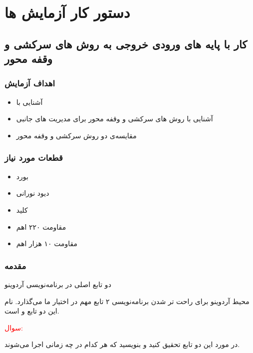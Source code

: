 \chapter{دستور کار آزمایش ها}

\section{کار با پایه های ورودی خروجی به روش های سرکشی و وقفه محور}

\subsection{اهداف آزمایش}
\begin{itemize}
    \item آشنایی با 
    \item آشنایی با روش های سرکشی و وقفه محور برای مدیریت  های جانبی
    \item مقایسه‌ی دو روش سرکشی و وقفه محور
\end{itemize}

\subsection{قطعات مورد نیاز}

\begin{itemize}
    \item بورد 
    \item دیود نورانی 
    \item کلید 
    \item مقاومت ۲۲۰ اهم
    \item مقاومت ۱۰ هزار اهم
\end{itemize}
\pagebreak

\subsection{مقدمه}

\begin{nas} دو تابع اصلی در برنامه‌نویسی آردوینو \end{nas}
\newline
محیط آردوینو برای راحت تر شدن برنامه‌نویسی ۲ تابع مهم در اختیار ما می‌گذارد. نام این دو تابع  و  است.
\newline
\textcolor{red}{\begin{nas}سوال: \end{nas}}
در مورد این دو تابع تحقیق کنید و بنویسید که هر کدام در چه زمانی اجرا می‌شوند.

